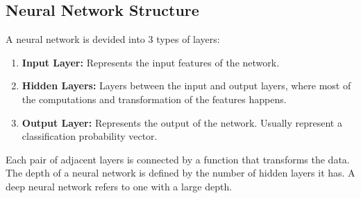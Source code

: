 \documentclass[12pt,a4paper]{report}
\begin{document}
\subsection{Neural Network Structure}
A neural network is devided into 3 types of layers:
\begin{enumerate}
    \item \textbf{Input Layer:} Represents the input features of the network.
    \item \textbf{Hidden Layers:} Layers between the input and output layers, where most of the computations and transformation of the features happens.
    \item \textbf{Output Layer:} Represents the output of the network. Usually represent a classification probability vector.
\end{enumerate}
Each pair of adjacent layers is connected by a function that transforms the data. The depth of a neural network is defined by the number of hidden layers it has. A deep neural network refers to one with a large depth.
\end{document}
